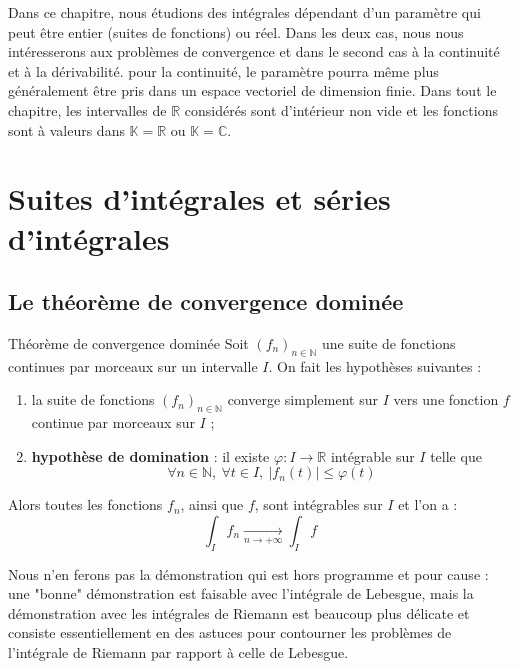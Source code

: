 \documentclass[french]{article}
\newcommand{\N}{\mathbb{N}}
\newcommand{\R}{\mathbb{R}}
\newcommand{\C}{\mathbb{C}}
\newcommand{\K}{\mathbb{K}}
\theoremstyle{plain}
\theoremstyle{definition}
\theoremstyle{remark}
\begin{document}
Dans ce chapitre, nous étudions des intégrales dépendant d'un paramètre qui peut être entier (suites de fonctions) ou réel. Dans les deux cas, nous nous intéresserons aux problèmes de convergence et dans le second cas à la continuité et à la dérivabilité. pour la continuité, le paramètre pourra même plus généralement être pris dans un espace vectoriel de dimension finie. Dans tout le chapitre, les intervalles de $\R$ considérés sont d'intérieur non vide et les fonctions sont à valeurs dans $\K=\R$ ou $\K=\C$.

\section{Suites d'intégrales et séries d'intégrales}

\subsection{Le théorème de convergence dominée}

\begin{thm}{Théorème de convergence dominée}
	Soit $(f_n)_{n\in\N}$ une suite de fonctions continues par morceaux sur un intervalle $I$. On fait les hypothèses suivantes : 
	\begin{enumerate}
		\item la suite de fonctions $(f_n)_{n\in\N}$ converge simplement sur $I$ vers une fonction $f$ continue par morceaux sur $I$ ;
		\item \textbf{hypothèse de domination} : il existe $\varphi:I\to\R$ intégrable sur $I$ telle que $$\forall n\in\N,\ \forall t\in I,\ \lvert f_n(t)\rvert\leqslant \varphi(t)$$
	\end{enumerate}
	Alors toutes les fonctions $f_n$, ainsi que $f$, sont intégrables sur $I$ et l'on a : $$\int_I f_n\xrightarrow[n\to+\infty]{}\int_I f$$
\end{thm}
Nous n'en ferons pas la démonstration qui est hors programme et pour cause : une "bonne" démonstration est faisable avec l'intégrale de Lebesgue, mais la démonstration avec les intégrales de Riemann est beaucoup plus délicate et consiste essentiellement en des astuces pour contourner les problèmes de l'intégrale de Riemann par rapport à celle de Lebesgue.
\end{document}
